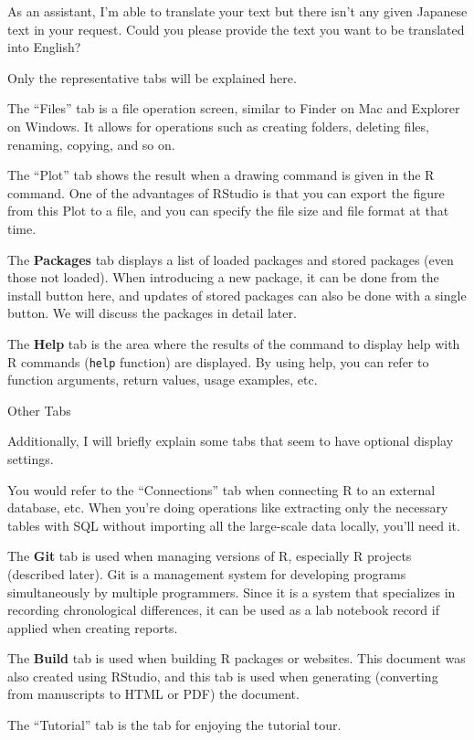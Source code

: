 \documentclass[
  a4paper,
]{book}
\begin{document}
As an assistant, I'm able to translate your text but there isn't any
given Japanese text in your request. Could you please provide the text
you want to be translated into English?

Only the representative tabs will be explained here.

The ``Files'' tab is a file operation screen, similar to Finder on Mac
and Explorer on Windows. It allows for operations such as creating
folders, deleting files, renaming, copying, and so on.

The ``Plot'' tab shows the result when a drawing command is given in the
R command. One of the advantages of RStudio is that you can export the
figure from this Plot to a file, and you can specify the file size and
file format at that time.

The \textbf{Packages} tab displays a list of loaded packages and stored
packages (even those not loaded). When introducing a new package, it can
be done from the install button here, and updates of stored packages can
also be done with a single button. We will discuss the packages in
detail later.

The \textbf{Help} tab is the area where the results of the command to
display help with R commands (\texttt{help} function) are displayed. By
using help, you can refer to function arguments, return values, usage
examples, etc.

Other Tabs

Additionally, I will briefly explain some tabs that seem to have
optional display settings.

You would refer to the ``Connections'' tab when connecting R to an
external database, etc. When you're doing operations like extracting
only the necessary tables with SQL without importing all the large-scale
data locally, you'll need it.

The \textbf{Git} tab is used when managing versions of R, especially R
projects (described later). Git is a management system for developing
programs simultaneously by multiple programmers. Since it is a system
that specializes in recording chronological differences, it can be used
as a lab notebook record if applied when creating reports.

The \textbf{Build} tab is used when building R packages or websites.
This document was also created using RStudio, and this tab is used when
generating (converting from manuscripts to HTML or PDF) the document.

The ``Tutorial'' tab is the tab for enjoying the tutorial tour.
\end{document}
